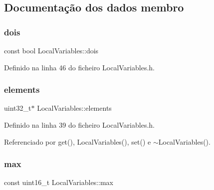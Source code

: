 \subsection{Documentação dos dados membro}
\mbox{\label{classLocalVariables_a8357edb6ae793a8f031ae3733751e1fc}} 
\subsubsection{\texorpdfstring{dois}{dois}}
{\footnotesize\ttfamily const bool Local\+Variables\+::dois\hspace{0.3cm}{\ttfamily [private]}}



Definido na linha 46 do ficheiro Local\+Variables.\+h.

\mbox{\label{classLocalVariables_a0015e9d8a61d4643f6f3594785467ae4}} 
\subsubsection{\texorpdfstring{elements}{elements}}
{\footnotesize\ttfamily uint32\+\_\+t$\ast$ Local\+Variables\+::elements\hspace{0.3cm}{\ttfamily [private]}}



Definido na linha 39 do ficheiro Local\+Variables.\+h.



Referenciado por get(), Local\+Variables(), set() e $\sim$\+Local\+Variables().

\mbox{\label{classLocalVariables_a55f33aaf9a0af5176d460616402c4aeb}} 
\subsubsection{\texorpdfstring{max}{max}}
{\footnotesize\ttfamily const uint16\+\_\+t Local\+Variables\+::max\hspace{0.3cm}{\ttfamily [private]}}



